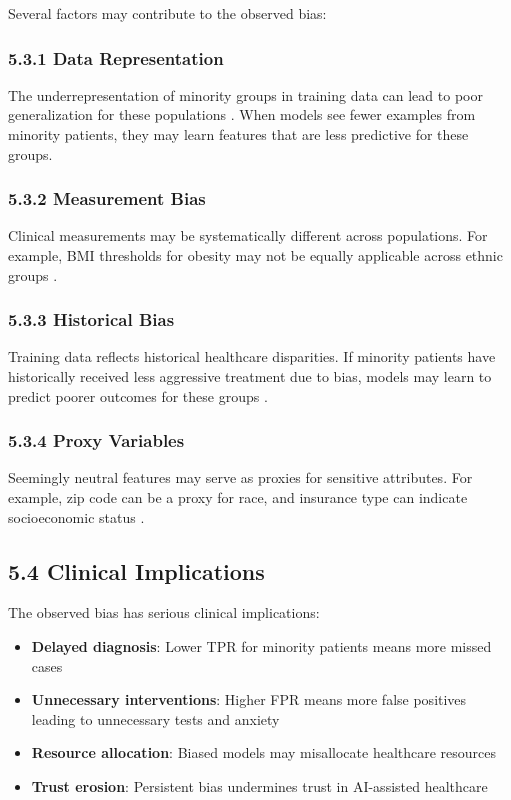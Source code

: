 \documentclass[12pt,a4paper]{article}
\begin{document}
Several factors may contribute to the observed bias:

\subsubsection{5.3.1 Data Representation}

The underrepresentation of minority groups in training data can lead to 
poor generalization for these populations \cite{mehrabi2021}. When models 
see fewer examples from minority patients, they may learn features that 
are less predictive for these groups.

\subsubsection{5.3.2 Measurement Bias}

Clinical measurements may be systematically different across populations. 
For example, BMI thresholds for obesity may not be equally applicable 
across ethnic groups \cite{who2000}.

\subsubsection{5.3.3 Historical Bias}

Training data reflects historical healthcare disparities. If minority 
patients have historically received less aggressive treatment due to bias, 
models may learn to predict poorer outcomes for these groups \cite{fries2019}.

\subsubsection{5.3.4 Proxy Variables}

Seemingly neutral features may serve as proxies for sensitive attributes. 
For example, zip code can be a proxy for race, and insurance type can 
indicate socioeconomic status \cite{lum2016}.

\subsection{5.4 Clinical Implications}

The observed bias has serious clinical implications:

\begin{itemize}
    \item \textbf{Delayed diagnosis}: Lower TPR for minority patients means 
          more missed cases
    \item \textbf{Unnecessary interventions}: Higher FPR means more false 
          positives leading to unnecessary tests and anxiety
    \item \textbf{Resource allocation}: Biased models may misallocate 
          healthcare resources
    \item \textbf{Trust erosion}: Persistent bias undermines trust in 
          AI-assisted healthcare
\end{itemize}
\end{document}
